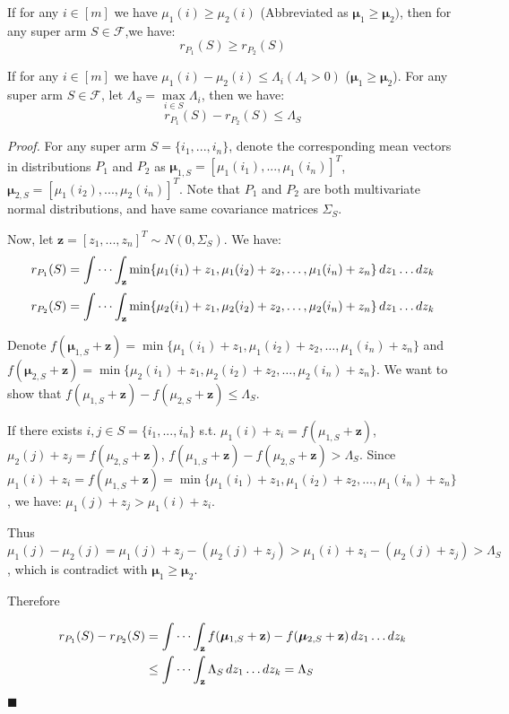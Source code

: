 \documentclass[opre,sglanonrev]{informs4}
\begin{document}
\begin{lemma}
If for any $i \in [m]$ we have $\mu_1(i) \geq \mu_2(i)$ (Abbreviated as $\boldsymbol{\mu}_1 \geq \boldsymbol{\mu}_2)$, then for any super arm $S \in \mathcal{F}$,we have:
$$
r_{P_1}(S) \geq r_{P_2}(S)
$$	
\end{lemma}

\begin{lemma}
If for any $i \in [m]$ we have $\mu_1(i) - \mu_2(i) \leq \Lambda_i (\Lambda_i>0)$ ($\boldsymbol{\mu}_1 \geq \boldsymbol{\mu}_2$). For any super arm $S \in \mathcal{F}$, let $\Lambda_S = \mathop{\max}\limits_{i\in S}\Lambda_i$, then we have:
$$
r_{P_1}(S) - r_{P_2}(S) \leq \Lambda_S
$$
\end{lemma}
\textit{Proof.} For any super arm $S = \{i_1,...,i_n\}$, denote the corresponding mean vectors in distributions $P_1$ and $P_2$ as $\boldsymbol{\mu}_{1,S} = [\mu_1(i_1),...,\mu_1(i_n)]^T$, $\boldsymbol{\mu}_{2,S} = [\mu_1(i_2),...,\mu_2(i_n)]^T$. Note that $P_1$ and $P_2$ are both multivariate normal distributions, and have same covariance matrices $\Sigma_S$.

Now, let $\mathbf{z} = [z_1,...,z_n]^T \sim N(0,\Sigma_S)$. We have:
$$
r_{P_1}(S) = \idotsint_\mathbf{z} \min \{\mu_1(i_1)+z_1,\mu_1(i_2)+z_2, \dots ,\mu_1(i_n)+z_n\} \,dz_1 \dots dz_k
$$
$$
r_{P_2}(S) = \idotsint_\mathbf{z} \min \{\mu_2(i_1)+z_1,\mu_2(i_2)+z_2, \dots ,\mu_2(i_n)+z_n\} \,dz_1 \dots dz_k
$$

Denote $f(\boldsymbol{\mu}_{1,S}+\mathbf{z}) = \min \{\mu_1(i_1)+z_1,\mu_1(i_2)+z_2, \dots ,\mu_1(i_n)+z_n\}$ and $f(\boldsymbol{\mu}_{2,S}+\mathbf{z}) = \min \{\mu_2(i_1)+z_1,\mu_2(i_2)+z_2, \dots ,\mu_2(i_n)+z_n\}$. We want to show that $f(\mu_{1,S}+\mathbf{z})-f(\mu_{2,S}+\mathbf{z})\leq \Lambda_S$.

If there exists $i,j\in S=\{i_1,...,i_n\}$ s.t. $\mu_1(i)+z_i = f(\mu_{1,S}+\mathbf{z})$, $\mu_2(j)+z_j = f(\mu_{2,S}+\mathbf{z})$, $f(\mu_{1,S}+\mathbf{z})-f(\mu_{2,S}+\mathbf{z})>\Lambda_S$. Since $\mu_1(i)+z_i = f(\mu_{1,S}+\mathbf{z}) = \min \{\mu_1(i_1)+z_1,\mu_1(i_2)+z_2, \dots ,\mu_1(i_n)+z_n\}$, we have: $\mu_1(j)+z_j> \mu_1(i)+z_i$.

Thus $\mu_1(j)-\mu_2(j) = \mu_1(j)+z_j-(\mu_2(j)+z_j)>\mu_1(i)+z_i-(\mu_2(j)+z_j)>\Lambda_S$, which is contradict with $\boldsymbol{\mu}_1 \geq \boldsymbol{\mu}_2$.

Therefore

$$
\begin{aligned}
r_{P_1}(S)-r_{P_2}(S) &= \idotsint_\mathbf{z} f(\boldsymbol{\mu}_{1,S}+\mathbf{z})-f(\boldsymbol{\mu}_{2,S}+\mathbf{z}) \,dz_1 \dots dz_k\\
&\leq \idotsint_\mathbf{z} \Lambda_S \,dz_1 \dots dz_k = \Lambda_S 
\end{aligned}
$$
\hfill $\blacksquare$
\end{document}
